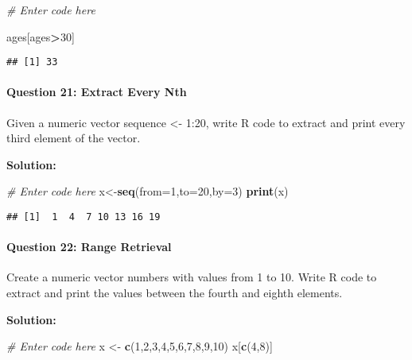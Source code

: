 \documentclass[
]{article}
\newenvironment{Shaded}{\begin{snugshade}}{\end{snugshade}}
\newcommand{\AttributeTok}[1]{\textcolor[rgb]{0.13,0.29,0.53}{#1}}
\newcommand{\CommentTok}[1]{\textcolor[rgb]{0.56,0.35,0.01}{\textit{#1}}}
\newcommand{\DecValTok}[1]{\textcolor[rgb]{0.00,0.00,0.81}{#1}}
\newcommand{\FunctionTok}[1]{\textcolor[rgb]{0.13,0.29,0.53}{\textbf{#1}}}
\newcommand{\NormalTok}[1]{#1}
\newcommand{\OtherTok}[1]{\textcolor[rgb]{0.56,0.35,0.01}{#1}}
\newcommand{\SpecialCharTok}[1]{\textcolor[rgb]{0.81,0.36,0.00}{\textbf{#1}}}
\begin{document}
\begin{Shaded}
\begin{Highlighting}[]
\CommentTok{\# Enter code here}

\NormalTok{ages[ages}\SpecialCharTok{\textgreater{}}\DecValTok{30}\NormalTok{]}
\end{Highlighting}
\end{Shaded}

\begin{verbatim}
## [1] 33
\end{verbatim}

\hypertarget{question-21-extract-every-nth}{%
\paragraph{Question 21: Extract Every
Nth}\label{question-21-extract-every-nth}}

Given a numeric vector sequence \textless- 1:20, write R code to extract
and print every third element of the vector.

\textbf{Solution:}

\begin{Shaded}
\begin{Highlighting}[]
\CommentTok{\# Enter code here}
\NormalTok{x}\OtherTok{\textless{}{-}}\FunctionTok{seq}\NormalTok{(}\AttributeTok{from=}\DecValTok{1}\NormalTok{,}\AttributeTok{to=}\DecValTok{20}\NormalTok{,}\AttributeTok{by=}\DecValTok{3}\NormalTok{)}
\FunctionTok{print}\NormalTok{(x)}
\end{Highlighting}
\end{Shaded}

\begin{verbatim}
## [1]  1  4  7 10 13 16 19
\end{verbatim}

\hypertarget{question-22-range-retrieval}{%
\paragraph{Question 22: Range
Retrieval}\label{question-22-range-retrieval}}

Create a numeric vector numbers with values from 1 to 10. Write R code
to extract and print the values between the fourth and eighth elements.

\textbf{Solution:}

\begin{Shaded}
\begin{Highlighting}[]
\CommentTok{\# Enter code here}
\NormalTok{x }\OtherTok{\textless{}{-}} \FunctionTok{c}\NormalTok{(}\DecValTok{1}\NormalTok{,}\DecValTok{2}\NormalTok{,}\DecValTok{3}\NormalTok{,}\DecValTok{4}\NormalTok{,}\DecValTok{5}\NormalTok{,}\DecValTok{6}\NormalTok{,}\DecValTok{7}\NormalTok{,}\DecValTok{8}\NormalTok{,}\DecValTok{9}\NormalTok{,}\DecValTok{10}\NormalTok{)}
\NormalTok{x[}\FunctionTok{c}\NormalTok{(}\DecValTok{4}\NormalTok{,}\DecValTok{8}\NormalTok{)]}
\end{Highlighting}
\end{Shaded}
\end{document}
